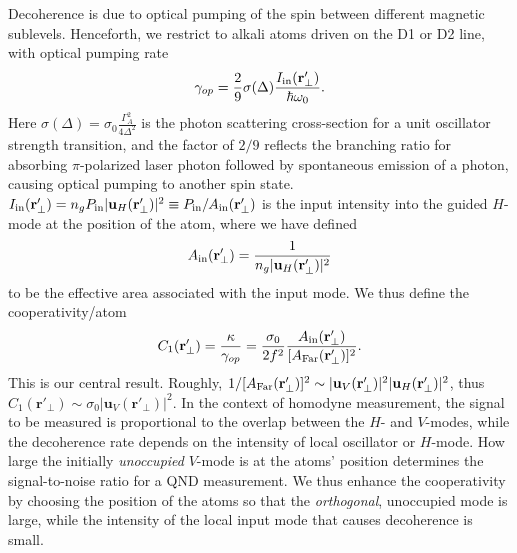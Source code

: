 \documentclass[preprint,aps,pra,onecolumn,superscriptaddress]{revtex4-1} %
\newcommand{\mbf}[1]{\mathbf{#1}}
\newcommand{\AF}{A_{\rm Far}} %
\newcommand{\Ai}{A_{\rm in}} %
\begin{document}
Decoherence is due to optical pumping of the spin between different magnetic sublevels.  Henceforth, we restrict to alkali atoms driven on the D1 or D2 line, with optical pumping rate 
\begin{equation}
\gamma_{op} =\frac{2}{9} \sigma(\Delta) \frac{I_{\rm in}(\mbf{r}'_\perp)}{\hbar \omega_0}.
\end{equation}
Here $\sigma(\Delta) = \sigma_0 \frac{\Gamma_A^2}{4 \Delta^2}$ is the photon scattering cross-section for a unit oscillator strength transition, and the factor of $2/9$ reflects the branching ratio for absorbing $\pi$-polarized laser photon followed by spontaneous emission of a photon, causing optical pumping to another spin state. $I_{\rm in}(\mbf{r}'_\perp) = n_g P_{\rm in}\vert \mbf{u}_H (\mbf{r}'_\perp)  \vert^2 \equiv P_{\rm in}/\Ai(\mbf{r}'_\perp) $ is the input intensity into the guided $H$-mode at the position of the atom,  where we have defined
\begin{equation}\label{eq:Ain}
\Ai(\mbf{r}'_\perp) =  \frac{1}{n_g \vert \mbf{u}_H (\mbf{r}'_\perp) \vert ^2}
\end{equation}
to be the effective area associated with the input mode.  We thus define the cooperativity/atom
\begin{equation}\label{eq:C1}
C_1 (\mbf{r}'_\perp)  = \frac{\kappa}{\gamma_{op}} =\frac{\sigma_0}{2f^2} \frac{  \Ai(\mbf{r}'_\perp) }{[\AF(\mbf{r}'_\perp)]^2}.
\end{equation}
This is our central result.  Roughly, $1/[\AF(\mbf{r}'_\perp)]^2 \sim \vert \mbf{u}_V (\mbf{r}'_\perp) \vert ^2 \vert \mbf{u}_H (\mbf{r}'_\perp) \vert ^2$, thus $ C_1(\mbf{r}'_\perp) \sim \sigma_0 \vert \mbf{u}_V (\mbf{r}'_\perp) \vert ^2$. In the context of homodyne measurement, the signal to be measured is proportional to the overlap between the $ H $- and $ V $-modes, while the decoherence rate depends on the intensity of local oscillator or $ H $-mode. How large the initially {\em unoccupied} $ V $-mode is at the atoms' position determines the signal-to-noise ratio for a QND measurement.  We thus enhance the cooperativity by choosing the position of the atoms so that the {\em orthogonal}, unoccupied mode is large, while the intensity of the local input mode that causes decoherence is small.
\end{document}

